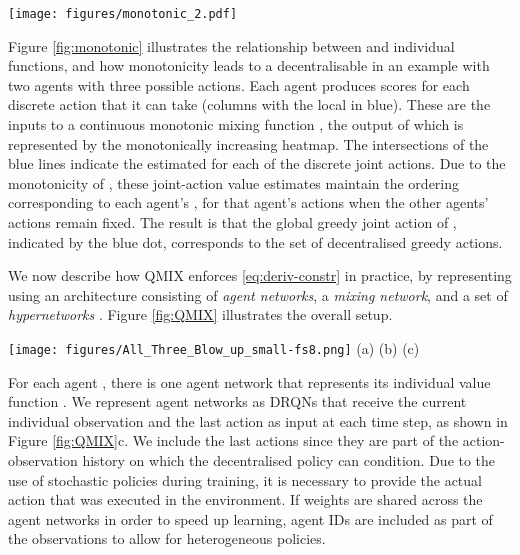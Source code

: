 \documentclass[twoside,11pt]{article}
\renewcommand{\cite}{\citep}
\begin{document}
\begin{figure*}[t]
	\centering
	\texttt{[image: figures/monotonic\_2.pdf]}
	\caption{The discrete per-agent action-value scores  are fed into the monotonic 
		function . The maximum  for each agent is shown in blue, which corresponds to the maximum  also shown in blue. The constraint \eqref{eq:argmax_constist} is 
		satisfied due to the monotonicity of . 
	}
	\label{fig:monotonic}
\end{figure*}

Figure \ref{fig:monotonic} illustrates the relationship between  and individual  functions, and how monotonicity leads to a decentralisable  in an example with two 
agents with three possible actions.
Each agent  produces scores  for each discrete action that it can 
take (columns with the local  in blue).
These are the inputs to a continuous monotonic mixing function 
, the output of which is represented by the monotonically 
increasing heatmap.
The intersections of the blue lines indicate the estimated  for each 
of the discrete joint actions.
Due to the monotonicity of , these joint-action value estimates 
maintain the ordering corresponding to each agent's , for that agent's 
actions when the other agents' actions remain fixed.
The result is that the global greedy joint action of , indicated by 
the blue dot, corresponds to the set of decentralised greedy actions. 

We now describe how QMIX enforces \eqref{eq:deriv-constr} in practice, by 
representing  using an architecture consisting of \textit{agent 
networks}, a \textit{mixing network}, and a set of \emph{hypernetworks} 
\cite{ha_hypernetworks_2016}.
Figure \ref{fig:QMIX} illustrates the overall setup.

\begin{figure*}[t]
	\centering
	\texttt{[image: figures/All\_Three\_Blow\_up\_small-fs8.png]}
	\text{~~~~~~~~~~~~~}(a) \hfill (b) \hfill (c) 
	\text{~~~~~~~~~~}
	\caption{(a) Mixing network structure. In red are the hypernetworks that 
	produce the weights and biases for mixing network layers shown in blue. (b) 
	The overall QMIX architecture. (c) Agent network structure. Best viewed in 
	colour.}
	\label{fig:QMIX}
\end{figure*}

For each agent , there is one agent network that represents its individual value function . We represent agent networks as DRQNs that receive the current individual observation  and the last action  as input at each time step, as shown in Figure \ref{fig:QMIX}c. We include the last actions since they are part of the action-observation history  on which the decentralised policy can condition. Due to the use of stochastic policies during training, it is necessary to provide the actual action that was executed in the environment. If weights are shared across the agent networks in order to speed up  learning, agent IDs are included as part of the observations to allow for heterogeneous policies. 
\end{document}
